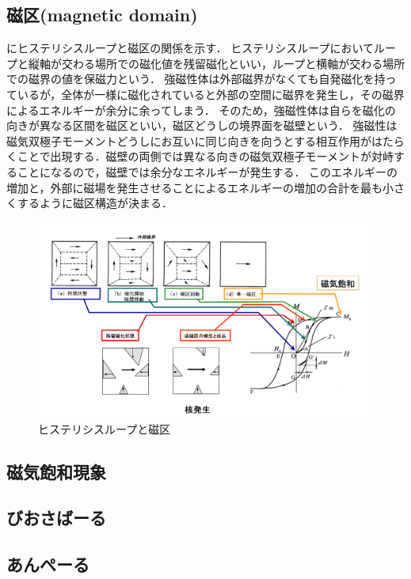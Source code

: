 \subsection{磁区(magnetic domain)\cite{7697152}}
にヒステリシスループと磁区の関係を示す．
ヒステリシスループにおいてループと縦軸が交わる場所での磁化値を残留磁化といい，ループと横軸が交わる場所での磁界の値を保磁力という．
強磁性体は外部磁界がなくても自発磁化を持っているが，全体が一様に磁化されていると外部の空間に磁界を発生し，その磁界によるエネルギーが余分に余ってしまう．
そのため，強磁性体は自らを磁化の向きが異なる区間を磁区といい，磁区どうしの境界面を磁壁という．
強磁性は磁気双極子モーメントどうしにお互いに同じ向きを向うとする相互作用がはたらくことで出現する．磁壁の両側では異なる向きの磁気双極子モーメントが対峙することになるので，磁壁では余分なエネルギーが発生する．
このエネルギーの増加と，外部に磁場を発生させることによるエネルギーの増加の合計を最も小さくするように磁区構造が決まる．
\begin{figure}[h]
	\centering
	\includegraphics[scale=0.35]{fig/domain.png}
	\caption{ヒステリシスループと磁区\cite{cite-keygsdfz}}
	\label{fig:domain}
\end{figure}

\subsection{磁気飽和現象}\label{hohwa}
\subsection{びおさばーる}
\subsection{あんぺーる}

